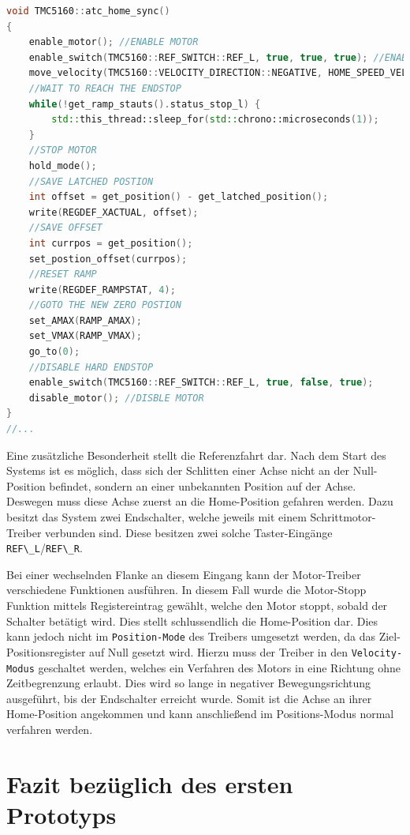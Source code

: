 \begin{lstlisting}[language={C++}]
void TMC5160::atc_home_sync()
{    
    enable_motor(); //ENABLE MOTOR
    enable_switch(TMC5160::REF_SWITCH::REF_L, true, true, true); //ENABLE LIMIT SWICHT => ENABLE HARD ENDSTOP
    move_velocity(TMC5160::VELOCITY_DIRECTION::NEGATIVE, HOME_SPEED_VELOCITY, 1000); //MOVE NEGATIVE TO LIMIT SWITCH
    //WAIT TO REACH THE ENDSTOP
    while(!get_ramp_stauts().status_stop_l) {
        std::this_thread::sleep_for(std::chrono::microseconds(1));
    }
    //STOP MOTOR
    hold_mode();
    //SAVE LATCHED POSTION
    int offset = get_position() - get_latched_position();
    write(REGDEF_XACTUAL, offset);
    //SAVE OFFSET
    int currpos = get_position();
    set_postion_offset(currpos);
    //RESET RAMP
    write(REGDEF_RAMPSTAT, 4);
    //GOTO THE NEW ZERO POSTION
    set_AMAX(RAMP_AMAX);
    set_VMAX(RAMP_VMAX);
    go_to(0);
    //DISABLE HARD ENDSTOP 
    enable_switch(TMC5160::REF_SWITCH::REF_L, true, false, true);
    disable_motor(); //DISBLE MOTOR
}
//...
\end{lstlisting}

Eine zusätzliche Besonderheit stellt die Referenzfahrt dar. Nach dem
Start des Systems ist es möglich, dass sich der Schlitten einer Achse
nicht an der Null-Position befindet, sondern an einer unbekannten
Position auf der Achse. Deswegen muss diese Achse zuerst an die
Home-Position gefahren werden. Dazu besitzt das System zwei Endschalter,
welche jeweils mit einem Schrittmotor-Treiber verbunden sind. Diese
besitzen zwei solche Taster-Eingänge
\passthrough{\lstinline!REF\_L!}/\passthrough{\lstinline!REF\_R!}.

Bei einer wechselnden Flanke an diesem Eingang kann der Motor-Treiber
verschiedene Funktionen ausführen. In diesem Fall wurde die Motor-Stopp
Funktion mittels Registereintrag gewählt, welche den Motor stoppt,
sobald der Schalter betätigt wird. Dies stellt schlussendlich die
Home-Position dar. Dies kann jedoch nicht im
\passthrough{\lstinline!Position-Mode!} des Treibers umgesetzt werden,
da das Ziel-Positionsregister auf Null gesetzt wird. Hierzu muss der
Treiber in den \passthrough{\lstinline!Velocity-Modus!} geschaltet
werden, welches ein Verfahren des Motors in eine Richtung ohne
Zeitbegrenzung erlaubt. Dies wird so lange in negativer
Bewegungsrichtung ausgeführt, bis der Endschalter erreicht wurde. Somit
ist die Achse an ihrer Home-Position angekommen und kann anschließend im
Positions-Modus normal verfahren werden.

\hypertarget{fazit-bezuxfcglich-des-ersten-prototyps}{%
\section{Fazit bezüglich des ersten
Prototyps}\label{fazit-bezuxfcglich-des-ersten-prototyps}}

